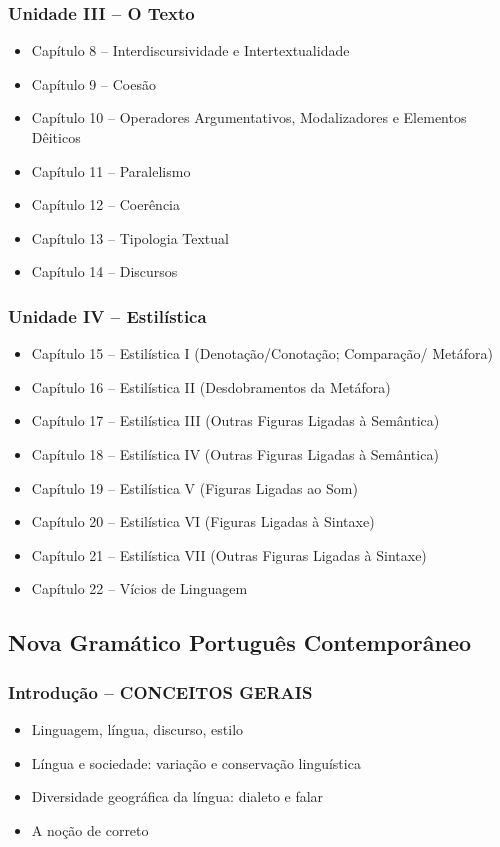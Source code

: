 \documentclass[a4paper,12pt]{article}[abntex2]
\begin{document}
\subsubsection*{Unidade III – O Texto}
\begin{itemize}
    \item Capítulo 8 – Interdiscursividade e Intertextualidade
    \item Capítulo 9 – Coesão
    \item Capítulo 10 – Operadores Argumentativos, Modalizadores e Elementos Dêiticos
    \item Capítulo 11 – Paralelismo
    \item Capítulo 12 – Coerência
    \item Capítulo 13 – Tipologia Textual
    \item Capítulo 14 – Discursos
\end{itemize}

\subsubsection*{Unidade IV – Estilística}
\begin{itemize}
    \item Capítulo 15 – Estilística I (Denotação/Conotação; Comparação/ Metáfora)
    \item Capítulo 16 – Estilística II (Desdobramentos da Metáfora)
    \item Capítulo 17 – Estilística III (Outras Figuras Ligadas à Semântica)
    \item Capítulo 18 – Estilística IV (Outras Figuras Ligadas à Semântica)
    \item Capítulo 19 – Estilística V (Figuras Ligadas ao Som)
    \item Capítulo 20 – Estilística VI (Figuras Ligadas à Sintaxe)
    \item Capítulo 21 – Estilística VII (Outras Figuras Ligadas à Sintaxe)
    \item Capítulo 22 – Vícios de Linguagem
\end{itemize}

\subsection{Nova Gramático Português Contemporâneo}

\subsubsection*{Introdução – CONCEITOS GERAIS}
\begin{itemize}
    \item Linguagem, língua, discurso, estilo
    \item Língua e sociedade: variação e conservação linguística
    \item Diversidade geográfica da língua: dialeto e falar
    \item A noção de correto
\end{itemize}
\end{document}
